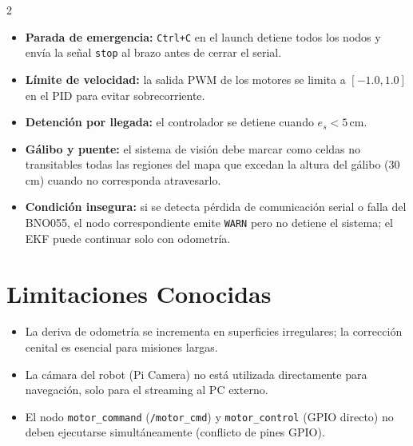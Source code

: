 \documentclass[10pt,a4paper]{article}
\newcommand{\topic}[1]{\texttt{\small #1}}
\begin{document}
\begin{multicols}{2}
\begin{itemize}
  \item \textbf{Parada de emergencia:} \texttt{Ctrl+C} en el launch detiene todos los nodos y envía la señal \texttt{stop} al brazo antes de cerrar el serial.
  \item \textbf{Límite de velocidad:} la salida PWM de los motores se limita a $[-1.0, 1.0]$ en el PID para evitar sobrecorriente.
  \item \textbf{Detención por llegada:} el controlador se detiene cuando $e_s < 5\,\text{cm}$.
  \item \textbf{Gálibo y puente:} el sistema de visión debe marcar como celdas no transitables todas las regiones del mapa que excedan la altura del gálibo (30\,cm) cuando no corresponda atravesarlo.
  \item \textbf{Condición insegura:} si se detecta pérdida de comunicación serial o falla del BNO055, el nodo correspondiente emite \texttt{WARN} pero no detiene el sistema; el EKF puede continuar solo con odometría.
\end{itemize}

\section{Limitaciones Conocidas}

\begin{itemize}
  \item La deriva de odometría se incrementa en superficies irregulares; la corrección cenital es esencial para misiones largas.
  \item La cámara del robot (Pi Camera) no está utilizada directamente para navegación, solo para el streaming al PC externo.
  \item El nodo \texttt{motor\_command} (\topic{/motor\_cmd}) y \texttt{motor\_control} (GPIO directo) no deben ejecutarse simultáneamente (conflicto de pines GPIO).
\end{itemize}

\end{multicols}
\end{document}
